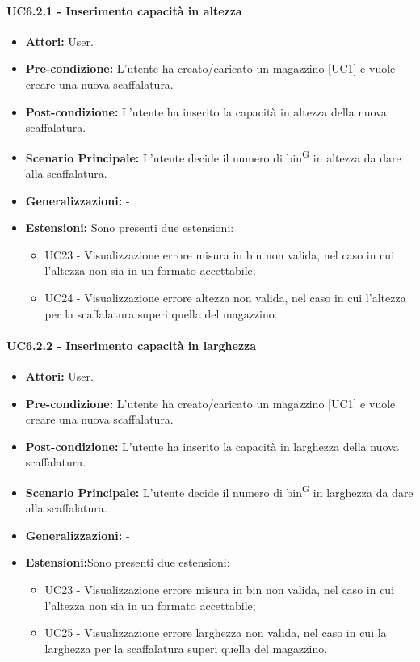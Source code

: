 \paragraph{UC6.2.1 - Inserimento capacità in altezza}
\begin{itemize}
    \item \textbf{Attori:} User.
    \item \textbf{Pre-condizione:} L'utente ha creato/caricato un magazzino [UC1] e vuole creare una nuova scaffalatura.
    \item \textbf{Post-condizione:}  L'utente ha inserito la capacità in altezza della nuova scaffalatura.
    \item \textbf{Scenario Principale:}  L'utente decide il numero di bin\textsuperscript{G} in altezza da dare alla scaffalatura. 
    \item \textbf{Generalizzazioni:} -
    \item \textbf{Estensioni:} Sono presenti due estensioni:
    \begin{itemize}
        \item UC23 - Visualizzazione errore misura in bin non valida, nel caso in cui l'altezza non sia in un formato accettabile;
        \item UC24 - Visualizzazione errore altezza non valida, nel caso in cui l'altezza per la scaffalatura superi quella del magazzino.
    \end{itemize}
\end{itemize}


\paragraph{UC6.2.2 - Inserimento capacità in larghezza}
\begin{itemize}
    \item \textbf{Attori:} User.
    \item \textbf{Pre-condizione:} L'utente ha creato/caricato un magazzino [UC1] e vuole creare una nuova scaffalatura.
    \item \textbf{Post-condizione:}  L'utente ha inserito la capacità in larghezza della nuova scaffalatura.
    \item \textbf{Scenario Principale:}  L'utente decide il numero di bin\textsuperscript{G} in larghezza da dare alla scaffalatura.
    \item \textbf{Generalizzazioni:} -
    \item \textbf{Estensioni:}Sono presenti due estensioni:
    \begin{itemize}
        \item UC23 - Visualizzazione errore misura in bin non valida, nel caso in cui l'altezza non sia in un formato accettabile;
        \item UC25 - Visualizzazione errore larghezza non valida, nel caso in cui la larghezza per la scaffalatura superi quella del magazzino.
    \end{itemize}
\end{itemize}